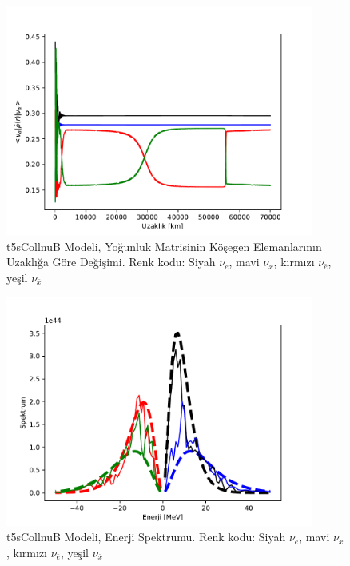 \newpage
\begin{figure}[hbt!]
    \centering
    \includegraphics[width=0.9\textwidth]{figures/t5sCollnuB_distdiag10.pdf}
    \caption[t5sCollnuB Modeli, Yoğunluk Matrisinin Köşegen Elemanlarının Uzaklığa Göre Değişimi.]{t5sCollnuB Modeli, Yoğunluk Matrisinin Köşegen Elemanlarının Uzaklığa Göre Değişimi. Renk kodu: Siyah $ \nu_{e} $, mavi $ \nu_{x} $, kırmızı $ \nu_{\bar{e}} $, yeşil $ \nu_{\bar{x}} $}
    \label{fig:t5sCollnuB_distdiag10}
\end{figure}
\begin{figure}[hbt!]
    \centering
    \includegraphics[width=0.9\textwidth]{figures/t5sCollnuB_spectrum.pdf}
    \caption[t5sCollnuB Modeli, Enerji Spektrumu.]{t5sCollnuB Modeli, Enerji Spektrumu. Renk kodu: Siyah $ \nu_{e} $, mavi $ \nu_{x} $, kırmızı $ \nu_{\bar{e}} $, yeşil $ \nu_{\bar{x}} $}
    \label{fig:t5sCollnuB_spectrum}
\end{figure}